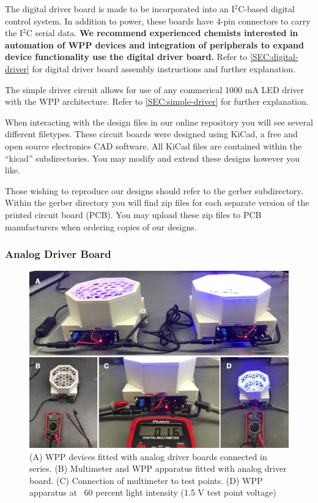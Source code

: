 \documentclass[11pt]{article}
\begin{document}
The digital driver board is made to be incorporated into an I$^2$C-based digital control system.
In addition to power, these boards have 4-pin connectors to carry the I$^2$C serial data.
\textbf{We recommend experienced chemists interested in automation of WPP devices and integration of peripherals to expand device functionality use the digital driver board.}
Refer to \autoref{SEC:digital-driver} for digital driver board assembly instructions and further explanation.

The simple driver circuit allows for use of any commerical 1000 mA LED driver with the WPP architecture.
Refer to \autoref{SEC:simple-driver} for further explanation.

When interacting with the design files in our online repository you will see several different filetypes.
These circuit boards were designed using KiCad, a free and open source electronics CAD software.
All KiCad files are contained within the ``kicad'' subdirectories.
You may modify and extend these designs however you like.

Those wishing to reproduce our designs should refer to the gerber subdirectory.
Within the gerber directory you will find zip files for each separate version of the printed circuit board (PCB).
You may upload these zip files to PCB manufacturers when ordering copies of our designs.

\clearpage
\subsubsection{Analog Driver Board} \label{SEC:analog-driver}

\begin{figure}[H]
	\centering
	\includegraphics[width=\textwidth]{"./fig11.png"}
	\caption{(A) WPP devices fitted with analog driver boards connected in series. (B) Multimeter and WPP apparatus fitted with analog driver board. (C) Connection of multimeter to test points. (D) WPP apparatus at ~60 percent light intensity (1.5 V test point voltage)}
\end{figure}
\end{document}
